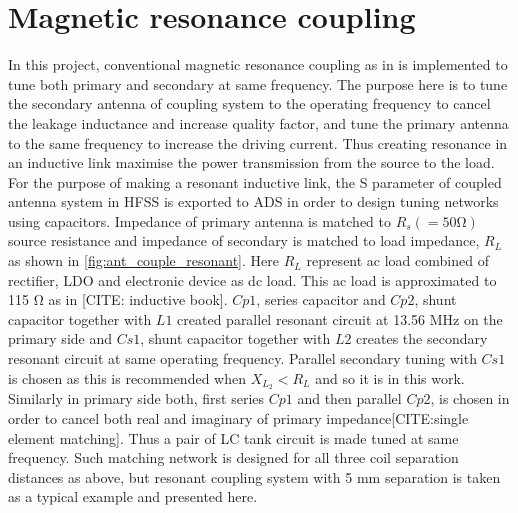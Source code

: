 \documentclass[UKenglish]{ifimaster}  %
\begin{document}
\section{Magnetic resonance coupling}  	%

In this project, conventional magnetic resonance coupling as in is implemented to tune both primary and secondary 
at same frequency. The purpose here is to tune the secondary antenna of 
coupling system to the operating frequency to cancel the leakage inductance and increase quality factor, and tune the primary antenna to the same frequency to increase the 
driving current. Thus creating resonance in an inductive link maximise the power transmission from the source to  the load.  \\


For the purpose of making a resonant inductive link, the S parameter of coupled antenna system in HFSS 
is exported to ADS in order to design tuning networks using capacitors. Impedance of  primary antenna is 
matched to $ R_{s}(=50 \si{\ohm}) $ source resistance and impedance of secondary is matched to load impedance, 
$R_{L}$ as shown in \ref{fig:ant_couple_resonant}. Here $R_{L}$ represent ac load combined of rectifier, LDO and electronic device as dc load. This ac load 
is approximated to 115 \si{\ohm} as in [CITE: inductive book]. $Cp1$, series capacitor and $Cp2$, shunt capacitor together 
with $L1$ created parallel resonant circuit at 13.56 MHz on the primary side and $Cs1$, shunt capacitor together with $L2$ 
creates the secondary resonant circuit at same operating frequency. Parallel secondary tuning with $Cs1$ is chosen as this is 
recommended when $X_{L_{2}} < R_{L}$ and so it is in this work. Similarly in primary side both, first series 
$Cp1$ and then parallel $Cp2$, is chosen in order to cancel both real and imaginary of primary impedance[CITE:single element matching]. Thus a pair of LC tank circuit is made tuned at same 
frequency. Such matching network is designed for all three coil separation distances as above, but resonant coupling system 
with 5 mm separation is taken as a typical example and presented here. \\
\end{document}
